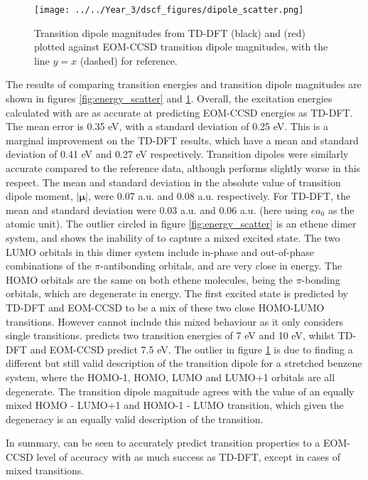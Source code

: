 \begin{figure}
\centering
\texttt{[image: ../../Year\_3/dscf\_figures/dipole\_scatter.png]}
\caption{Transition dipole magnitudes from TD-DFT (black) and \dscf (red) plotted
against EOM-CCSD transition dipole magnitudes, with the line $y=x$ (dashed) for 
reference.}
\label{fig:dipole_scatter}
\end{figure}

The results of comparing transition energies and transition dipole magnitudes are
shown in figures \ref{fig:energy_scatter} and \ref{fig:dipole_scatter}. Overall, 
the excitation energies calculated with \dscf are as accurate at predicting EOM-CCSD
energies as TD-DFT. The mean error is 0.35 eV, with a standard deviation of 0.25 eV.
This is a marginal improvement on the TD-DFT results, which have a mean and standard
deviation of 0.41 eV and 0.27 eV respectively. Transition dipoles were similarly
accurate compared to the reference data, although \dscf performs slightly worse
in this respect. The mean and standard deviation in the absolute value of transition
dipole moment, $|\mathbf{\mu}|$, were 0.07 a.u. and 0.08 a.u. respectively. For 
TD-DFT, the mean and standard deviation were 0.03 a.u. and 0.06 a.u. (here using 
$ea_0$ as the atomic unit).
The outlier circled in figure \ref{fig:energy_scatter} is an ethene dimer system,
and shows the inability of \dscf to capture a mixed excited state. The two LUMO
orbitals in this dimer system include in-phase and out-of-phase combinations of the 
$\pi$-antibonding orbitals, and are very close in energy. The HOMO orbitals are
the same on both ethene molecules, being the $\pi$-bonding orbitals, which are
degenerate in energy. The first excited state is predicted by TD-DFT and EOM-CCSD
to be a mix of these two close HOMO-LUMO transitions. However \dscf cannot include
this mixed behaviour as it only considers single transitions. \dscf predicts two
transition energies of 7 eV and 10 eV, whilst TD-DFT and EOM-CCSD predict 7.5 eV.
The outlier in figure \ref{fig:dipole_scatter} is due to \dscf finding a different
but still valid description of the transition dipole for a stretched benzene system,
where the HOMO-1, HOMO, LUMO and LUMO+1 orbitals are all degenerate. The \dscf transition
dipole magnitude agrees with the value of an equally mixed HOMO - LUMO+1 and HOMO-1 
- LUMO transition, which given the degeneracy is an equally valid description of 
the transition.

In summary, \dscf can be seen to accurately predict transition properties
to a EOM-CCSD level of accuracy with as much success as TD-DFT, except in cases
of mixed transitions. 

